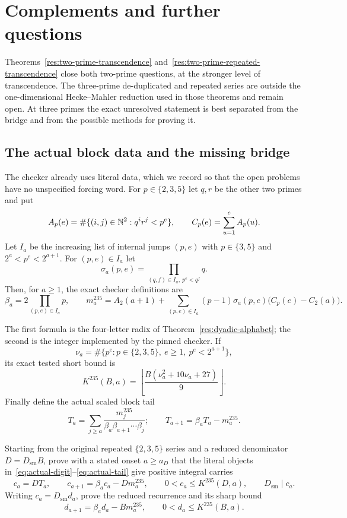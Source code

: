 \documentclass[11pt]{article}
\begin{document}
\section{Complements and further questions}\label{sec:open}

Theorems~\ref{res:two-prime-transcendence}
and~\ref{res:two-prime-repeated-transcendence} close both two-prime questions,
at the stronger level of transcendence.  The three-prime de-duplicated and
repeated series are outside the one-dimensional Hecke--Mahler reduction used
in those theorems and remain open.  At three primes the exact unresolved
statement is best separated from the bridge and from the possible methods for
proving it.

\subsection{The actual block data and the missing bridge}

The checker already uses literal data, which we record so that the open
problems have no unspecified forcing word.  For $p\in\{2,3,5\}$ let $q,r$ be
the other two primes and put
\[
 A_p(e)=\#\{(i,j)\in\mathbb{N}^2:q^i r^j<p^e\},\qquad
 C_p(e)=\sum_{u=1}^{e}A_p(u).
\]
Let $I_a$ be the increasing list of internal jumps $(p,e)$ with
$p\in\{3,5\}$ and $2^a<p^e<2^{a+1}$.  For $(p,e)\in I_a$ let
\[
 \sigma_a(p,e)=\prod_{(q,f)\in I_a,\ p^e<q^f}q.
\]
Then, for $a\ge1$, the exact checker definitions are
\[
 \beta_a=2\prod_{(p,e)\in I_a}p,\qquad
 m_a^{235}=A_2(a+1)+
   \sum_{(p,e)\in I_a}(p-1)\sigma_a(p,e)
       \bigl(C_p(e)-C_2(a)\bigr).
\tag{9.1}\label{eq:actual-digit}
\]

The first formula is the four-letter radix of
Theorem~\ref{res:dyadic-alphabet}; the second is the integer implemented by the
pinned checker.  If
\[
 \nu_a=\#\{p^e:p\in\{2,3,5\},\ e\ge1,\ p^e<2^{a+1}\},
\]
its exact tested short bound is
\[
 K^{235}(B,a)=
 \left\lfloor\frac{B(\nu_a^2+10\nu_a+27)}9\right\rfloor.
\tag{9.2}\label{eq:actual-bound}
\]
Finally define the actual scaled block tail
\[
 T_a=\sum_{j\ge a}
   \frac{m_j^{235}}{\beta_a\beta_{a+1}\cdots\beta_j};
 \qquad T_{a+1}=\beta_aT_a-m_a^{235}.
\tag{9.3}\label{eq:actual-tail}
\]

\begin{problem}\label{prob:bridge269}
Starting from the original repeated $\{2,3,5\}$ series and a reduced
denominator $D=D_{\mathrm{sm}}B$, prove with a stated onset $a\ge a_D$ that
the literal objects in~\eqref{eq:actual-digit}--\eqref{eq:actual-tail} give
positive integral carries
\[
 c_a=DT_a,\qquad
 c_{a+1}=\beta_ac_a-Dm_a^{235},\qquad
 0<c_a\le K^{235}(D,a),\qquad D_{\mathrm{sm}}\mid c_a.
\]
Writing $c_a=D_{\mathrm{sm}}d_a$, prove the reduced recurrence and its sharp
bound
\[
 d_{a+1}=\beta_ad_a-Bm_a^{235},\qquad
 0<d_a\le K^{235}(B,a).
\]
\end{problem}
\end{document}
